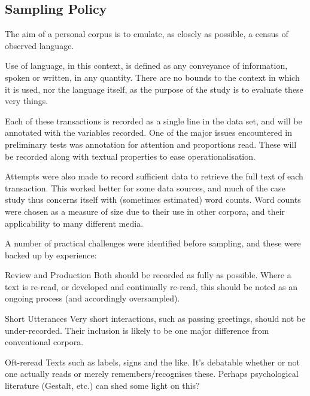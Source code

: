 \subsection{Sampling Policy}
\label{sec:personal:samplingpolicy}
The aim of a personal corpus is to emulate, as closely as possible, a census of observed language.

Use of language, in this context, is defined as any conveyance of information, spoken or written, in any quantity. There are no bounds to the context in which it is used, nor the language itself, as the purpose of the study is to evaluate these very things.

Each of these transactions is recorded as a single line in the data set, and will be annotated with the variables recorded.  One of the major issues encountered in preliminary tests was annotation for attention and proportions read.  These will be recorded along with textual properties to ease operationalisation.

Attempts were also made to record sufficient data to retrieve the full text of each transaction.  This worked better for some data sources, and much of the case study thus concerns itself with (sometimes estimated) word counts.  Word counts were chosen as a measure of size due to their use in other corpora, and their applicability to many different media.


A number of practical challenges were identified before sampling, and these were backed up by experience:
\begin{itemizeTitle}
    \item[Review and Production] Both should be recorded as fully as possible. Where a text is re-read, or developed and continually re-read, this should be noted as an ongoing process (and accordingly oversampled).
    \item[Short Utterances] Very short interactions, such as passing greetings, should not be under-recorded. Their inclusion is likely to be one major difference from conventional corpora.
    \item[Oft-reread Texts] such as labels, signs and the like. It’s debatable whether or not one actually reads or merely remembers/recognises these. Perhaps psychological literature (Gestalt, etc.) can shed some light on this?
\end{itemizeTitle}
